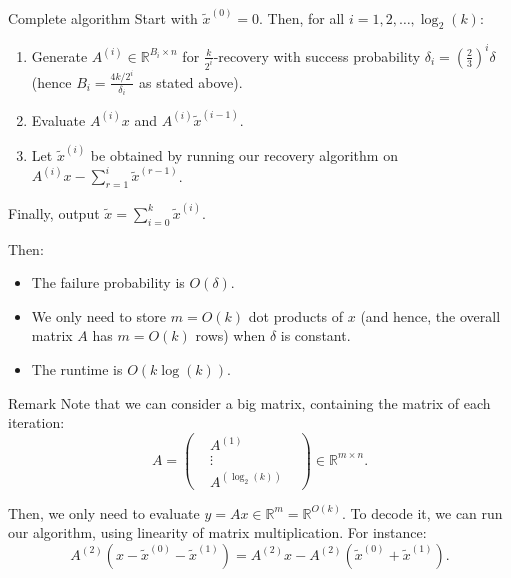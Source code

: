 \documentclass[a4paper]{article}
\begin{document}
\begin{parag}{Complete algorithm}
    Start with $\widetilde{x}^{\left(0\right)} = 0$. Then, for all $i = 1, 2, \ldots, \log_2\left(k\right)$:
    \begin{enumerate}
        \item Generate $A^{\left(i\right)} \in \mathbb{R}^{B_i \times n}$ for $\frac{k}{2^i}$-recovery with success probability $\delta_i = \left(\frac{2}{3}\right)^i \delta$ (hence $B_i = \frac{4 k/2^i}{\delta_i}$ as stated above).
        \item Evaluate $A^{\left(i\right)} x$ and $A^{\left(i\right)} \widetilde{x}^{\left(i-1\right)}$.
        \item Let $\widetilde{x}^{\left(i\right)}$ be obtained by running our recovery algorithm on $A^{\left(i\right)} x - \sum_{r=1}^{i} \widetilde{x}^{\left(r-1\right)}$.
    \end{enumerate}
    Finally, output $\widetilde{x} = \sum_{i=0}^{k} \widetilde{x}^{\left(i\right)}$.

    Then:
    \begin{itemize}
        \item The failure probability is $O\left(\delta\right)$.
        \item We only need to store $m = O\left(k\right)$ dot products of $x$ (and hence, the overall matrix $A$ has $m = O\left(k\right)$ rows) when $\delta$ is constant.
        \item The runtime is $O\left(k \log\left(k\right)\right)$.
    \end{itemize}
    
    \begin{subparag}{Remark}
        Note that we can consider a big matrix, containing the matrix of each iteration: 
        \[A = \begin{pmatrix}  & A^{\left(1\right)} &  \\  & \vdots &  \\  & A^{\left(\log_2\left(k\right)\right)} &  \end{pmatrix} \in \mathbb{R}^{m \times n}.\]

        Then, we only need to evaluate $y = A x \in \mathbb{R}^{m} = \mathbb{R}^{O\left(k\right)}$. To decode it, we can run our algorithm, using linearity of matrix multiplication. For instance: 
        \[A^{\left(2\right)}\left(x - \widetilde{x}^{\left(0\right)} - \widetilde{x}^{\left(1\right)}\right) = A^{\left(2\right)} x - A^{\left(2\right)} \left(\widetilde{x}^{\left(0\right)} + \widetilde{x}^{\left(1\right)}\right).\]
    \end{subparag}
    

\end{parag}
\end{document}
